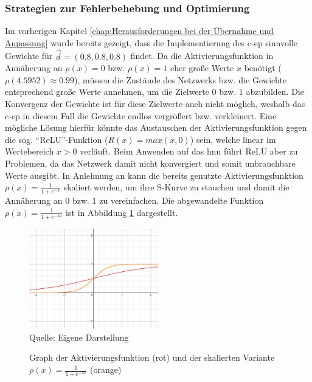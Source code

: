 \subsubsection{Strategien zur Fehlerbehebung und Optimierung}
\label{chap:Strategien zur Fehlerbehebung und Optimierung}

Im vorherigen Kapitel \ref{chap:Herausforderungen bei der Übernahme und Anpassung} wurde bereits gezeigt, dass die Implementierung des \ac{c-ep} sinnvolle Gewichte für \(\vec{d}=(0.8,0.8,0.8)\) findet. Da die Aktivierungsfunktion in Annäherung an \(\rho(x)=0\) bzw. \(\rho(x)=1\) eher große Werte \(x\) benötigt (\(\rho(4.5952)\approx0.99\)), müssen die Zustände des Netzwerks bzw. die Gewichte entsprechend große Werte annehmen, um die Zielwerte \(0\) bzw. \(1\) abzubilden. Die Konvergenz der Gewichte ist für diese Zielwerte auch nicht möglich, weshalb das \ac{c-ep} in diesem Fall die Gewichte endlos vergrößert bzw. verkleinert. Eine mögliche Lösung hierfür könnte das Austauschen der Aktivierungsfunktion gegen die sog. "`ReLU"'-Funktion (\(R(x)=max(x,0)\)) sein, welche linear im Wertebereich \(x>0\) verläuft. Beim Anwenden auf das \ac{hnn} führt ReLU aber zu Problemen, da das Netzwerk damit nicht konvergiert und somit unbrauchbare Werte ausgibt. In Anlehnung an \cite[vgl. S. 31]{Ernoult2020} kann die bereits genutzte Aktivierungsfunktion \(\rho(x)=\frac{1}{1+e^{-x}}\) skaliert werden, um ihre S-Kurve zu stauchen und damit die Annäherung an \(0\) bzw. \(1\) zu vereinfachen. Die abgewandelte Funktion \(\rho(x)=\frac{1}{1+e^{-4x}}\) ist in Abbildung \ref{fig:Graph der skalierten Aktivierungsfunktion} dargestellt.

\begin{figure}[h]
  \label{fig:Graph der skalierten Aktivierungsfunktion}
  \caption{Graph der Aktivierungsfunktion (rot) und der skalierten Variante \(\rho(x)=\frac{1}{1+e^{-4x}}\) (orange)}
  \includegraphics[width=0.5\textwidth]{abbildungen/sigmoid_funktion_skaliert.png}
  \\
  Quelle: Eigene Darstellung
\end{figure}

